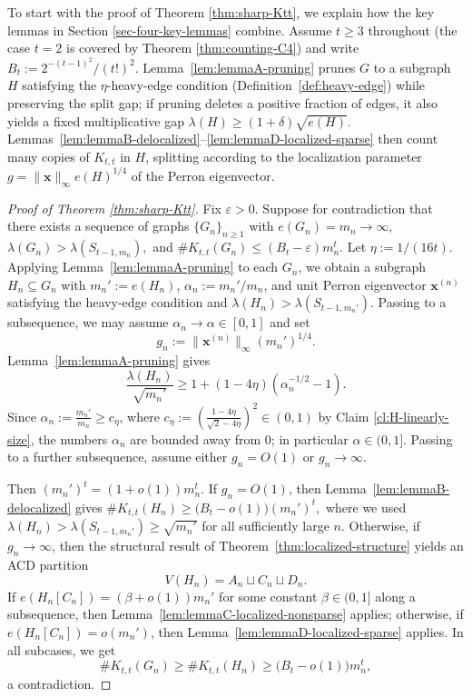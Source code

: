\documentclass[11pt]{article}
\theoremstyle{definition}
\theoremstyle{plain}
\newcommand{\Ktt}{K_{t,t}}
\begin{document}
To start with the proof of Theorem \ref{thm:sharp-Ktt}, we explain how the key lemmas in Section \ref{sec-four-key-lemmas} combine.
Assume $t\ge 3$ throughout (the case $t=2$ is covered by Theorem \ref{thm:counting-C4}) and write
$B_t:=2^{-(t-1)^2}/(t!)^2$.
Lemma~\ref{lem:lemmaA-pruning} prunes $G$ to a subgraph $H$ satisfying the $\eta$-heavy-edge condition
(Definition~\ref{def:heavy-edge}) while preserving the split gap; if pruning deletes a positive fraction of edges, it also yields a fixed
multiplicative gap $\lambda(H)\ge (1+\delta)\sqrt{e(H)}$.
Lemmas~\ref{lem:lemmaB-delocalized}--\ref{lem:lemmaD-localized-sparse} then count many copies of $\Ktt$ in $H$, splitting according to the
localization parameter $g =\|\bm{x}\|_\infty e(H)^{1/4}$ of the Perron eigenvector.

\begin{proof}[Proof of Theorem \ref{thm:sharp-Ktt}]
Fix \(\varepsilon>0\). Suppose for contradiction that there exists a sequence of graphs \(\{G_n\}_{n\ge1}\) with $e(G_n)=m_n\to\infty,$ $\lambda(G_n)>\lambda(S_{t-1,m_n}),$
and $\texttt{\#}\Ktt(G_n)\le (B_t-\varepsilon)m_n^t.$
Let \(\eta:=1/(16t)\).
Applying Lemma~\ref{lem:lemmaA-pruning} to each \(G_n\), we obtain a subgraph $H_n\subseteq G_n$ with $m_n':=e(H_n)$,
$\alpha_n:=m_n'/m_n$, and unit Perron eigenvector $\bm{x}^{(n)}$ satisfying the heavy-edge condition and
$\lambda(H_n)>\lambda(S_{t-1,m_n'})$. 
Passing to a subsequence, we may assume $\alpha_n\to\alpha\in[0,1]$ and set
\[
        g_n:=\|\bm{x}^{(n)}\|_\infty(m_n')^{1/4}.
\]
Lemma~\ref{lem:lemmaA-pruning} gives
\[
        \frac{\lambda(H_n)}{\sqrt{m_n'}}
        \ge
        1+(1-4\eta)(\alpha_n^{-1/2}-1).
\]
Since $\alpha_n := \frac{m_n'}{m_n} \ge c_{\eta} $, where $c_{\eta}:=\left(\frac{1-4\eta}{\sqrt{2}-4\eta}\right)^2\in(0,1)$
by Claim \ref{cl:H-linearly-size}, the numbers $\alpha_n$ are bounded away from $0$; in particular
$\alpha\in(0,1]$.
Passing to a further subsequence, assume either $g_n=O(1)$ or $g_n\to\infty$.

\smallskip

Then $(m_n')^t=(1+o(1))m_n^t$.
If $g_n=O(1)$, then Lemma~\ref{lem:lemmaB-delocalized} gives
$\texttt{\#}\Ktt(H_n)
        \ge
        \bigl(B_t-o(1)\bigr)(m_n')^t,$
where we used $\lambda(H_n)>\lambda(S_{t-1,m_n'})\ge \sqrt{m_n'}$ for all sufficiently large \(n\).
Otherwise, if $g_n\to\infty$, then the structural result of Theorem~\ref{thm:localized-structure} yields an ACD partition
\[
        V(H_n)=A_n\sqcup C_n\sqcup D_n.
\]
If $e(H_n[C_n])=(\beta+o(1))m_n'$ for some constant $\beta\in(0,1]$ along a subsequence, then
Lemma~\ref{lem:lemmaC-localized-nonsparse}  applies; otherwise, if $e(H_n[C_n])=o(m_n')$, then 
Lemma~\ref{lem:lemmaD-localized-sparse} applies.
In all subcases, we get
\[
    \texttt{\#}\Ktt(G_n)
        \ge
        \texttt{\#}\Ktt(H_n)
        \ge
        \bigl(B_t-o(1)\bigr)m_n^t,
\]
a contradiction.


\end{proof}
\end{document}
